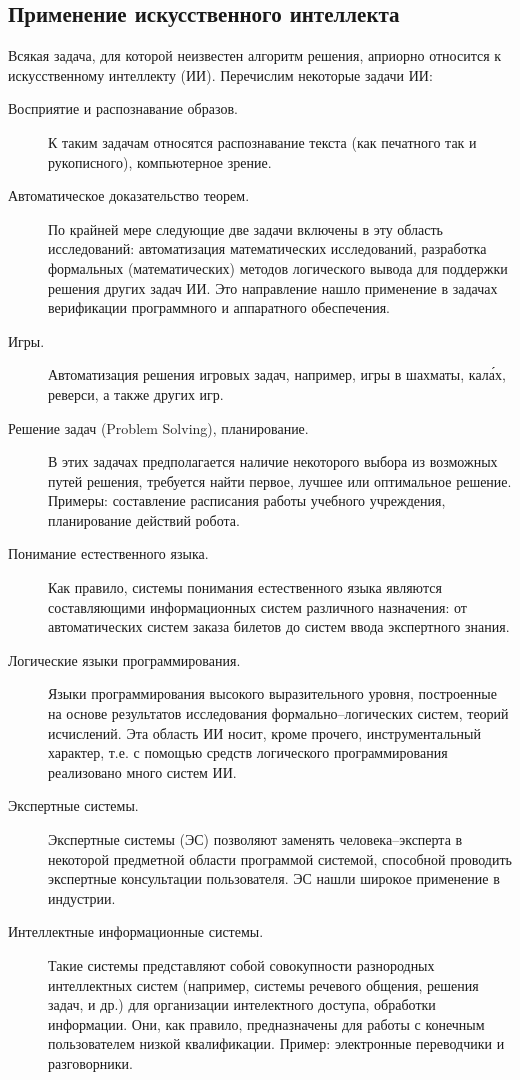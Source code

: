 \documentclass[12pt, openany, twoside]{book} %
\begin{document}
\subsection{Применение искусственного интеллекта}

Всякая задача, для которой неизвестен алгоритм решения, априорно относится к искусственному интеллекту (ИИ). Перечислим некоторые задачи ИИ:
\begin{description}
 \item [Восприятие и распознавание образов.] К таким задачам относятся распознавание текста (как печатного так и рукописного), компьютерное зрение.
 \item [Автоматическое доказательство теорем.] По крайней мере следующие две задачи включены в эту область ис\-сле\-до\-ваний: автоматизация математических исследований, разработка формальных (математических) методов логического вывода для поддержки решения других задач ИИ. Это направление нашло применение в задачах верификации программного и аппаратного обеспечения.
 \item [Игры.] Автоматизация решения игровых задач, например, игры в шахматы, кал\'{а}х, реверси, а также других игр.
 \item [Решение задач (Problem Solving), планирование.] В этих задачах предполагается наличие некоторого выбора из возможных путей решения, требуется найти первое, лучшее или оптимальное решение. Примеры: составление расписания работы учебного учреждения, планирование действий робота.
 \item [Понимание естественного языка.] Как правило, си\-сте\-мы понимания естественного языка являются составляющими информационных систем различного назначения: от автоматических систем заказа билетов до систем ввода экспертного знания.
 \item [Логические языки программирования.] Языки программирования  высокого выразительного уровня, построенные на основе результатов исследования формально--ло\-ги\-чес\-ких систем, теорий исчислений. Эта область ИИ носит, кроме прочего, инструментальный характер, т.е. с помощью средств логического программирования реализовано много систем ИИ.
 \item [Экспертные системы.] Экспертные системы  (ЭС) позволяют заменять человека--эксперта в некоторой предметной области программой системой, способной проводить экспертные консультации пользователя. ЭС нашли широкое применение в индустрии.
 \item [Интеллектные информационные системы.] Такие сис\-те\-мы представляют собой совокупности  разнородных интеллектных систем (например, системы речевого общения, решения задач, и др.) для организации интелектного доступа, обработки информации. Они, как правило, предназначены для работы с конечным пользователем низкой квалификации. Пример: электронные переводчики и разговорники.

\end{description}
\end{document}
